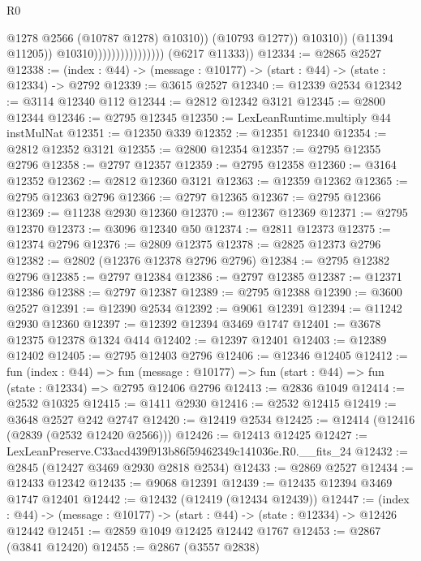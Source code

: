 \begin{lexlean}{R0}
\begin{coremodule}
                                                  @1278
                                                  @2566
                                                  (@10787 @1278)
                                                  @10310))
                                              (@10793 @1277))
                                            @10310))
                                        (@11394 @11205))
                                      @10310))))))))))))))))
      (@6217 @11333))
@12334 := @2865 @2527
@12338 := (index : @44) -> (message : @10177) -> (start : @44) -> (state : @12334) -> @2792
@12339 := @3615 @2527
@12340 := @12339 @2534
@12342 := @3114 @12340 @112
@12344 := @2812 @12342 @3121
@12345 := @2800 @12344
@12346 := @2795 @12345
@12350 := LexLeanRuntime.multiply @44 instMulNat
@12351 := @12350 @339
@12352 := @12351 @12340
@12354 := @2812 @12352 @3121
@12355 := @2800 @12354
@12357 := @2795 @12355 @2796
@12358 := @2797 @12357
@12359 := @2795 @12358
@12360 := @3164 @12352
@12362 := @2812 @12360 @3121
@12363 := @12359 @12362
@12365 := @2795 @12363 @2796
@12366 := @2797 @12365
@12367 := @2795 @12366
@12369 := @11238 @2930 @12360
@12370 := @12367 @12369
@12371 := @2795 @12370
@12373 := @3096 @12340 @50
@12374 := @2811 @12373
@12375 := @12374 @2796
@12376 := @2809 @12375
@12378 := @2825 @12373 @2796
@12382 := @2802 (@12376 @12378 @2796 @2796)
@12384 := @2795 @12382 @2796
@12385 := @2797 @12384
@12386 := @2797 @12385
@12387 := @12371 @12386
@12388 := @2797 @12387
@12389 := @2795 @12388
@12390 := @3600 @2527
@12391 := @12390 @2534
@12392 := @9061 @12391
@12394 := @11242 @2930 @12360
@12397 := @12392 @12394 @3469 @1747
@12401 := @3678 @12375 @12378 @1324 @414
@12402 := @12397 @12401
@12403 := @12389 @12402
@12405 := @2795 @12403 @2796
@12406 := @12346 @12405
@12412 := fun (index : @44) =>
  fun (message : @10177) => fun (start : @44) => fun (state : @12334) => @2795 @12406 @2796
@12413 := @2836 @1049
@12414 := @2532 @10325
@12415 := @1411 @2930
@12416 := @2532 @12415
@12419 := @3648 @2527 @242 @2747
@12420 := @12419 @2534
@12425 := @12414 (@12416 (@2839 (@2532 @12420 @2566)))
@12426 := @12413 @12425
@12427 := LexLeanPreserve.C33acd439f913b86f59462349c141036e.R0.__fits_24
@12432 := @2845 (@12427 @3469 @2930 @2818 @2534)
@12433 := @2869 @2527
@12434 := @12433 @12342
@12435 := @9068 @12391
@12439 := @12435 @12394 @3469 @1747 @12401
@12442 := @12432 (@12419 (@12434 @12439))
@12447 := (index : @44) -> (message : @10177) -> (start : @44) -> (state : @12334) -> @12426 @12442
@12451 := @2859 @1049 @12425 @12442 @1767
@12453 := @2867 (@3841 @12420)
@12455 := @2867 (@3557 @2838)

\end{coremodule}
\end{lexlean}
